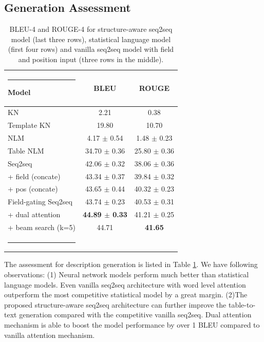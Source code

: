 \documentclass[letterpaper]{article} %
\makeatletter
\def\hlinewd#1{%
  \noalign{\ifnum0=`}\fi\hrule \@height #1 \futurelet
   \reserved@a\@xhline}
\makeatother
\begin{document}
\subsection{Generation Assessment}

\begin{table}[t]
	\begin{center}
		\begin{tabular}{lcc}		
		\hlinewd{1pt} \textbf{Model} & \textbf{BLEU} & \textbf{ROUGE} \\ \hline
		KN & 2.21 & 0.38 \\ 
		Template KN & 19.80 & 10.70 \\
		NLM & 4.17 $\pm$ 0.54 & 1.48 $\pm$ 0.23 \\ 
		Table NLM & 34.70 $\pm$ 0.36 & 25.80 $\pm$ 0.36  \\ \hline
		Seq2seq   & 42.06 $\pm$ 0.32 & 38.06 $\pm$ 0.36 \\
		+ field (concate) & 43.34 $\pm$ 0.37 & 39.84 $\pm$ 0.32\\
		+ pos (concate) & 43.65 $\pm$ 0.44 & 40.32 $\pm$ 0.23 \\ \hline
		Field-gating Seq2seq & 43.74 $\pm$ 0.23 & 40.53 $\pm$ 0.31 \\
		+ dual attention & \textbf{44.89 $\pm$ 0.33} & 41.21 $\pm$ 0.25 \\
		+ beam search (k=5) & 44.71& \textbf{41.65} \\
			\hlinewd{1pt} \\
		\end{tabular}
		\caption{BLEU-4 and ROUGE-4 for structure-aware seq2seq model (last three rows), statistical language model (first four rows) and vanilla seq2seq model with field and position input (three rows in the middle).}
		\label{res}
	\end{center}
\end{table}

The assessment for description generation is listed in Table \ref{res}. We have following observations:
(1) Neural network models perform much better than statistical language models. Even vanilla seq2seq architecture with word level attention outperform the most competitive statistical model by a great margin.
(2)The proposed structure-aware seq2seq architecture can further improve the table-to-text generation compared with the competitive vanilla seq2seq. Dual attention mechanism is able to boost the model performance by over 1 BLEU compared to vanilla attention mechanism.
\end{document}
